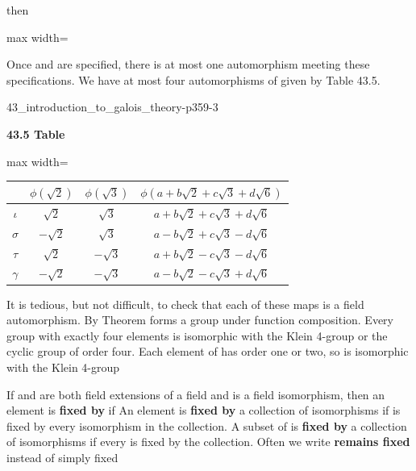 \documentclass[11pt,oneside]{article}
\begin{document}
\begin{BookBody}

\noindent then

\begin{center}\begin{adjustbox}{max width=\linewidth}\end{adjustbox}\end{center}

Once  and  are specified, there is at most one automorphism meeting these specifications. We have at most four automorphisms of  given by Table 43.5.

\begin{BookFloat}{43_introduction_to_galois_theory-p359-3}
\begin{center}\small\textbf{43.5 Table}\end{center}
\begin{center}\begin{adjustbox}{max width=\linewidth}
\renewcommand{\arraystretch}{1.3}\setlength{\tabcolsep}{4pt}
\begin{tabular}{c|c|c|c}
 & $\phi(\sqrt2)$ & $\phi(\sqrt3)$ & $\phi(a+b\sqrt2+c\sqrt3+d\sqrt6)$\\\hline
$\iota$ & $\sqrt2$ & $\sqrt3$ & $a+b\sqrt2+c\sqrt3+d\sqrt6$\\
$\sigma$ & $-\sqrt2$ & $\sqrt3$ & $a-b\sqrt2+c\sqrt3-d\sqrt6$\\
$\tau$ & $\sqrt2$ & $-\sqrt3$ & $a+b\sqrt2-c\sqrt3-d\sqrt6$\\
$\gamma$ & $-\sqrt2$ & $-\sqrt3$ & $a-b\sqrt2-c\sqrt3+d\sqrt6$
\end{tabular}\end{adjustbox}\end{center}
\end{BookFloat}

It is tedious, but not difficult, to check that each of these maps is a field automorphism. By Theorem  forms a group under function composition. Every group with exactly four elements is isomorphic with the Klein 4-group or the cyclic group of order four. Each element of  has order one or two, so  is isomorphic with the Klein 4-group\BookEnd{\blacktriangle}

 If  and  are both field extensions of a field  and  is a field isomorphism, then an element  is\textbf{ fixed by} \BookInline{\sigma } if  An element  is\textbf{ fixed by} a collection of isomorphisms if \BookInline{\alpha } is fixed by every isomorphism in the collection. A subset  of  is\textbf{ fixed by} a collection of isomorphisms if every  is fixed by the collection. Often we write\textbf{ remains fixed} instead of simply fixed\BookEnd{\blacksquare}


\end{BookBody}
\end{document}
